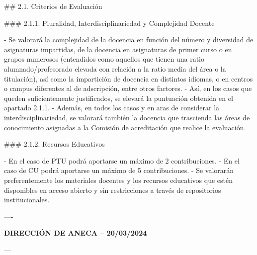 \documentclass{article}
\begin{document}
\begin{itemize}
\begin{itemize}
\begin{scriptsize}
                  \#\# 2.1. Criterios de Evaluación

                  \#\#\# 2.1.1. Pluralidad, Interdisciplinariedad y Complejidad Docente

                  - Se valorará la complejidad de la docencia en función del número y diversidad de asignaturas impartidas, de la docencia en asignaturas de primer curso o en grupos numerosos (entendidos como aquellos que tienen una ratio alumnado/profesorado elevada con relación a la ratio media del área o la titulación), así como la impartición de docencia en distintos idiomas, o en centros o campus diferentes al de adscripción, entre otros factores.
                  - Así, en los casos que queden suficientemente justificados, se elevará la puntuación obtenida en el apartado 2.1.1.
                  - Además, en todos los casos y en aras de considerar la interdisciplinariedad, se valorará también la docencia que trascienda las áreas de conocimiento asignadas a la Comisión de acreditación que realice la evaluación.

                  \#\#\# 2.1.2. Recursos Educativos

                  - En el caso de PTU podrá aportarse un máximo de 2 contribuciones.
                  - En el caso de CU podrá aportarse un máximo de 5 contribuciones.
                  - Se valorarán preferentemente los materiales docentes y los recursos educativos que estén disponibles en acceso abierto y sin restricciones a través de repositorios institucionales.

                  ----

                  \textbf{DIRECCIÓN DE ANECA – 20/03/2024}

                  ---


\end{scriptsize}
\end{itemize}
\end{itemize}
\end{document}
